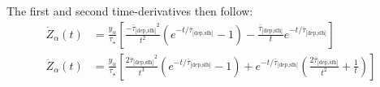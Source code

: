 \documentclass[12pt]{article}
\newcommand{\ah}{\ensuremath{\text{[$\alpha$/H]}}}
\newcommand{\mh}{\ensuremath{\text{[M/H]}}}
\newcommand{\timescale}[1]{\ensuremath{\tau_\text{#1}}}
\newcommand{\harmonic}[2]{\ensuremath{\bar{\tau}_\text{[#1,#2]}}}
\begin{document}
The first and second time-derivatives then follow:
\begin{subequations}\begin{align}
\dot{Z}_\alpha(t) &= \frac{y_\alpha}{\tau_\star} \left[
\frac{-\harmonic{dep}{sfh}^2}{t^2} \left(e^{-t / \harmonic{dep}{sfh}} - 1\right)
- \frac{\harmonic{dep}{sfh}}{t} e^{-t / \harmonic{dep}{sfh}}
\right]
\\
\ddot{Z}_\alpha(t) &= \frac{y_\alpha}{\tau_\star} \left[
\frac{2\harmonic{dep}{sfh}^2}{t^3} \left(e^{-t / \harmonic{dep}{sfh}} - 1\right)
+ e^{-t / \harmonic{dep}{sfh}} \left(\frac{2\harmonic{dep}{sfh}}{t^2} +
\frac{1}{t}\right)
\right]
\end{align}\end{subequations}














\end{document}
